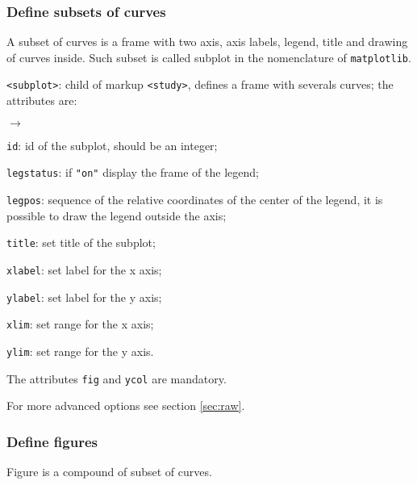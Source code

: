 \documentclass[a4paper,10pt,twoside]{article}
\begin{document}
\subsubsection{Define subsets of curves}

A subset of curves is a frame with two axis, axis labels, legend, title and
drawing of curves inside. Such subset is called subplot in the nomenclature
of \texttt{matplotlib}.

\texttt{<subplot>}: child of markup \texttt{<study>}, defines a frame with
severals curves; the attributes are:
\begin{list}{$\rightarrow$}{}
\item \texttt{id}: id of the subplot, should be an integer;
\item \texttt{legstatus}: if \texttt{"on"} display the frame of the legend;
\item \texttt{legpos}: sequence of the relative coordinates of the center of
the legend, it is possible to draw the legend outside the axis;
\item \texttt{title}: set title of the subplot;
\item \texttt{xlabel}: set label for the x axis;
\item \texttt{ylabel}: set label for the y axis;
\item \texttt{xlim}: set range for the x axis;
\item \texttt{ylim}: set range for the y axis.
\end{list}

The attributes \texttt{fig} and \texttt{ycol} are mandatory.

For more advanced options see section \ref{sec:raw}.

\subsubsection{Define figures}

Figure is a compound of subset of curves.
\end{document}
